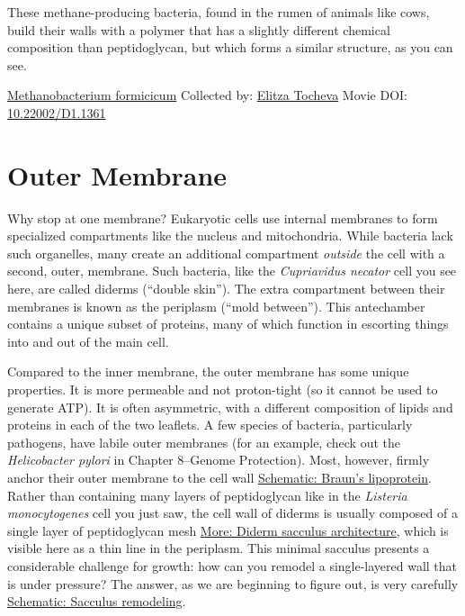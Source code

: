 \documentclass[]{tufte-book}
\begin{document}
These methane-producing bacteria, found in the rumen of animals like cows, build their walls with a polymer that has a slightly different chemical composition than peptidoglycan, but which forms a similar structure, as you can see.



\hypertarget{htmlwidget-5ef305308a4b8aa6dac8}{}

\label{fig:2-2b}\protect\hyperlink{tree}{Methanobacterium formicicum} Collected by: \protect\hyperlink{elitza_tocheva}{Elitza Tocheva} Movie DOI: \href{https://doi.org/10.22002/D1.1361}{10.22002/D1.1361}

\hypertarget{outer-membrane}{%
\section{Outer Membrane}\label{outer-membrane}}

Why stop at one membrane? Eukaryotic cells use internal membranes to form specialized compartments like the nucleus and mitochondria. While bacteria lack such organelles, many create an additional compartment \emph{outside} the cell with a second, outer, membrane. Such bacteria, like the \emph{Cupriavidus necator} cell you see here, are called diderms (``double skin''). The extra compartment between their membranes is known as the periplasm (``mold between''). This antechamber contains a unique subset of proteins, many of which function in escorting things into and out of the main cell.

Compared to the inner membrane, the outer membrane has some unique properties. It is more permeable and not proton-tight (so it cannot be used to generate ATP). It is often asymmetric, with a different composition of lipids and proteins in each of the two leaflets. A few species of bacteria, particularly pathogens, have labile outer membranes (for an example, check out the \emph{Helicobacter pylori} in Chapter 8--Genome Protection). Most, however, firmly anchor their outer membrane to the cell wall \protect\hyperlink{Brauns_lipoprotein}{Schematic: Braun's lipoprotein}. Rather than containing many layers of peptidoglycan like in the \emph{Listeria monocytogenes} cell you just saw, the cell wall of diderms is usually composed of a single layer of peptidoglycan mesh \protect\hyperlink{Diderm_sacculus_architecture}{More: Diderm sacculus architecture}, which is visible here as a thin line in the periplasm. This minimal sacculus presents a considerable challenge for growth: how can you remodel a single-layered wall that is under pressure? The answer, as we are beginning to figure out, is very carefully \protect\hyperlink{Sacculus_remodeling}{Schematic: Sacculus remodeling}.
\end{document}
